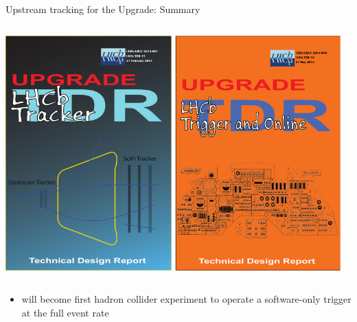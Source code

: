 \documentclass[aspectratio=1610]{beamer}
\begin{document}
\begin{frame}{Upstream tracking for the Upgrade: Summary}
\begin{columns}
\begin{column}{0.25\textwidth}
\href{https://cds.cern.ch/record/1647400}{\includegraphics[width=0.48\textwidth]{figs/Tracking.pdf}}
\href{https://cds.cern.ch/record/1701361}{\includegraphics[width=0.48\textwidth]{figs/Trigger.pdf}}
\end{column}
\end{columns}

\bigskip\bigskip

\begin{itemize}
\item[\ding{80}] \lhcb will become first hadron collider experiment to operate a software-only trigger at the full event rate
\end{itemize}

\end{frame}
\end{document}

